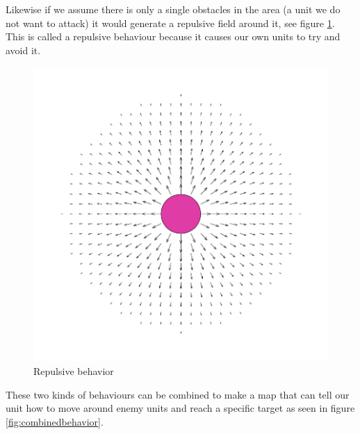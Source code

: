 	Likewise if we assume there is only a single obstacles in the area (a unit we do not want to attack) it would generate a repulsive field around it, 
	see figure \ref{fig:avoidbehavior}. This is called a repulsive behaviour because it causes our own units to try and avoid it.

		
	\begin{figure}[H]
		\begin{center}
			\includegraphics[scale=0.3]{Figures/Potentialfields/avoid.png}
			\caption{Repulsive behavior\cite{pft}}\label{fig:avoidbehavior}
		\end{center}
	\end{figure}
		
	These two kinds of behaviours can be combined to make a map that can tell our unit 
	how to move around enemy units and reach a specific target as seen in figure \ref{fig:combinedbehavior}.
			
